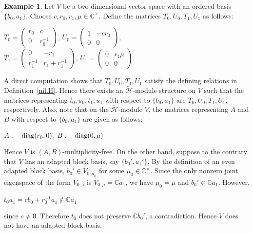 \documentclass[reqno]{amsart}
\theoremstyle{definition}
\newtheorem{example}[theorem]{Example}
\begin{document}
\begin{example}
%
{\rm
Let $V$ be a two-dimensional vector space with an ordered basis $\{b_0,a_1\}$.
Choose $c, r_0,r_1, \mu \in \mathbb{C}^{\times}$.
Define the matrices $T_0,U_0,T_1,U_1$ as follows:
\begin{center}
$T_0 = \begin{pmatrix}r_0&c\\0&r_0^{-1}\end{pmatrix}$,\quad
$U_0 = \begin{pmatrix}1&-cr_0\\0&0\end{pmatrix}$,\\[5pt]
$T_1 = \begin{pmatrix}0&-r_1\\ r_1^{-1}&r_1+r_1^{-1}\end{pmatrix}$,\quad
$U_1 = \begin{pmatrix}0&r_1\mu\\0&0\end{pmatrix}$.
\end{center}
A direct computation shows that
$T_0,U_0,T_1,U_1$ satisfy the defining relations in
Definition~\ref{nil.H}.
Hence there exists an $\widetilde{\mathcal{H}}$-module structure on $V$ such that
the matrices representing $t_0,u_0,t_1,u_1$ with respect to
$\{b_0,a_1\}$ are $T_0,U_0,T_1,U_1$, respectively.
Also, note that on the $\widetilde{\mathcal{H}}$-module $V$,
the matrices representing $A$ and $B$ with respect to $\{b_0,a_1\}$ are given as follows:
\begin{center}
$A : \quad {\rm diag}(r_0,0)$, \quad $B: \quad {\rm diag}(0,\mu)$.
\end{center}
Hence $V$ is $(A,B)$-multiplicity-free.
On the other hand,
suppose to the contrary that $V$ has an adapted block basis, say $\{b_0',a_1'\}$.
By the definition of an even adapted block basis,
$b_0' \in V_{0,\mu_0}$ for some $\mu_0 \in \mathbb{C}^{\times}$.
Since the only nonzero joint eigenspace of the form $V_{0,\beta}$ is $V_{0,\mu}= \mathbb{C}a_1$,
we have $\mu_0 = \mu$ and $b_0' \in \mathbb{C}a_1$.
However,
\begin{center}
$t_0a_1 = cb_0 + r_0^{-1} a_1 \notin \mathbb{C}a_1$
\end{center}
since $c \neq 0$.
Therefore $t_0$ does not preserve $\mathbb{C}b_0'$, a contradiction.
Hence $V$ does not have an adapted block basis.

}
\end{example}
\end{document}
